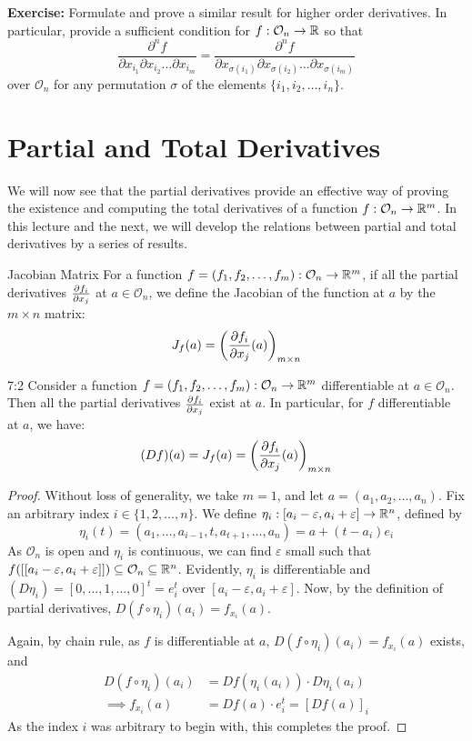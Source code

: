 \documentclass[../Analysis-3.tex]{subfiles}
\begin{document}
\textbf{Exercise:} Formulate and prove a similar result for higher order derivatives. In particular, provide a sufficient condition for $f: \mathcal{O}_n \to \mathbb{R}$ so that
\[\frac{\partial^n f}{\partial x_{i_1} \partial x_{i_2} \dots \partial x_{i_m}} = \frac{\partial^n f}{\partial x_{\sigma(i_1)} \partial x_{\sigma(i_2)} \dots \partial x_{\sigma(i_m)}}\]
over $\mathcal{O}_n$ for any permutation $\sigma$ of the elements $\{i_1,i_2,\dots,i_n\}$.

\section{Partial and Total Derivatives}

We will now see that the partial derivatives provide an effective way of proving the existence and computing the total derivatives of a function $f: \mathcal{O}_n \to \mathbb{R}^m$. In this lecture and the next, we will develop the relations between partial and total derivatives by a series of results.

\begin{Def}{Jacobian Matrix}{}
  For a function $f = (f_1, f_2, \dots, f_m): \mathcal{O}_n \to \mathbb{R}^m$, if all the partial derivatives $\pdv{f_i}{x_j}$ at $a \in \mathcal{O}_n$, we define the Jacobian of the function at $a$ by the $m \times n$ matrix:
  \[J_f(a) = \left( \pdv{f_i}{x_j}\/(a) \right)_{m \times n}\]
\end{Def}

\begin{Thm}{}{7:2}
  Consider a function $f = (f_1, f_2, \dots, f_m): \mathcal{O}_n \to \mathbb{R}^m$ differentiable at $a \in \mathcal{O}_n$. Then all the partial derivatives $\pdv{f_i}{x_j}$ exist at $a$. In particular, for $f$ differentiable at $a$, we have:
  \[(Df)(a) = J_f(a) = \left( \pdv{f_i}{x_j} \/ (a)\right)_{m \times n}\]
\end{Thm}

\begin{proof}
  Without loss of generality, we take $m = 1$, and let $a = (a_1, a_2, \dots, a_n)$. Fix an arbitrary index $i \in \{1,2,\dots,n \}$. We define $\eta_i : [a_i - \varepsilon,a_i + \varepsilon] \to \mathbb{R}^n$, defined by
  \[\eta_i(t) = (a_1, \dots, a_{i-1}, t, a_{t+1}, \dots, a_n) = a + (t-a_i)e_i \]
  As $\mathcal{O}_n$ is open and $\eta_i$ is continuous, we can find $\varepsilon$ small such that $f([[a_i - \varepsilon,a_i + \varepsilon]]) \subseteq \mathcal{O}_n \subseteq \mathbb{R}^n$. Evidently, $\eta_i$ is differentiable and $(D\eta_i) = [0,\dots,1,\dots,0]^t = e_i^t$ over $[a_i - \varepsilon,a_i + \varepsilon]$. Now, by the definition of partial derivatives, \(D(f\circ\eta_i)(a_i) = f_{x_i} (a)\).

  Again, by chain rule, as $f$ is differentiable at $a$, $D(f\circ\eta_i)(a_i) = f_{x_i}(a)$ exists, and
  \begin{align*}
    D(f\circ\eta_i)(a_i) & = Df(\eta_i(a_i)) \cdot D\eta_i (a_i) \\
    \implies f_{x_i} (a) & = Df(a) \cdot e_i^t = [Df(a)]_i
  \end{align*}
  As the index $i$ was arbitrary to begin with, this completes the proof.

\end{proof}
\end{document}
